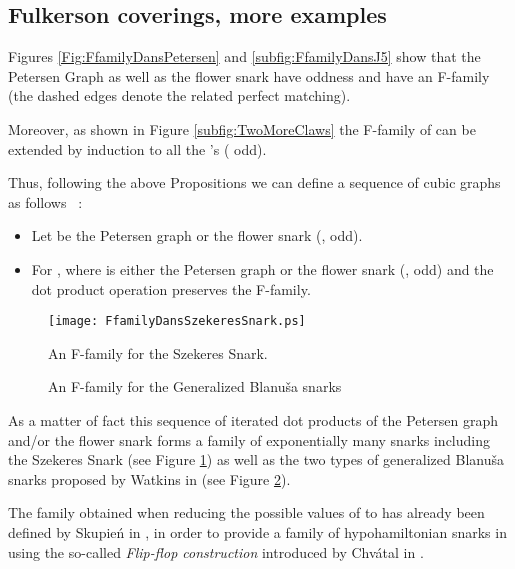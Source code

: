 \documentclass{amsart}
\theoremstyle{definition}
\theoremstyle{remark}
\begin{document}
\subsection{Fulkerson coverings, more examples}
Figures \ref{Fig:FfamilyDansPetersen} and \ref{subfig:FfamilyDansJ5} show
that the Petersen Graph as well as the flower snark  have oddness  and
have an F-family (the dashed edges denote the related perfect matching).




Moreover, as shown in Figure \ref{subfig:TwoMoreClaws} the F-family of  can be extended by induction to all the 's ( odd).

Thus, following the above Propositions we can define a sequence  of cubic graphs as follows ~:
\begin{itemize}
 \item Let  be the Petersen graph or the flower snark  (,  odd).
 \item For ,  where  is either the
Petersen graph or the flower snark  (,  odd) and the dot product operation preserves
the F-family.
\end{itemize}
\begin{figure}
\texttt{[image: FfamilyDansSzekeresSnark.ps]}
\caption{An F-family  for the Szekeres Snark.} \label{Fig:FfamilyDansSzekeres}
\end{figure}
\begin{figure}
\caption{An F-family  for the Generalized Blanu\v{s}a snarks} \label{Figure:GeneralizedBlanusa}
\end{figure}



As a matter of fact this sequence of iterated dot products of the Petersen graph
and/or the flower snark  forms a family of exponentially many snarks
including the Szekeres Snark (see Figure \ref{Fig:FfamilyDansSzekeres}) as well as the two types of generalized Blanu\v{s}a snarks proposed by Watkins in \cite{Wat89} (see Figure \ref{Figure:GeneralizedBlanusa}). 

The family obtained when reducing the possible values of  to   has already been defined by Skupie\'n in \cite{Sku89}, in order to provide a family
of hypohamiltonian snarks in using the so-called {\em Flip-flop construction}
introduced by Chv\'atal in \cite{Chv73}.
\end{document}
